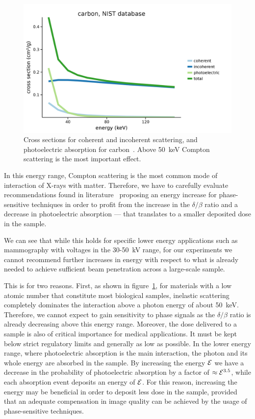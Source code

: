 \begin{figure}[htb]
    \centering
    \includegraphics[width=\textwidth]{gfx/compton/carbon_cross_section.png}
    \caption[Scattering cross sections.]{Cross sections for coherent and incoherent scattering, and
        photoelectric absorption for carbon~\parencite{nist}. Above \SI{50}{\kilo\eV} Compton
    scattering is the most important effect.}
    \label{fig:carbon-cross-sections}
\end{figure}

In this energy range, Compton scattering is the most common mode of
interaction of X-rays with matter. Therefore, we have to carefully evaluate recommendations found in
literature~\parencite{Wong2014} proposing an energy increase for
phase-sensitive techniques in order to profit from the increase in the
$\delta/\beta$ ratio and a decrease in photoelectric absorption --- that
translates to a smaller deposited dose in the sample.

We can see that while this holds for specific lower energy applications such
as mammography with voltages in the \num{30}-\SI{50}{\kilo\volt} range, for
our experiments we cannot recommend further increases in energy with respect
to what is already needed to achieve sufficient beam penetration across a
large-scale sample.

This is for two reasons. First, as shown in
figure~\ref{fig:carbon-cross-sections}, for materials with a low atomic
number that constitute most biological samples, inelastic scattering
completely dominates the interaction above a photon energy of about \SI{50}{\kilo\eV}.
Therefore, we cannot expect to gain sensitivity to phase signals as the
$\delta/\beta$ ratio is already decreasing above this energy range.
Moreover, the dose delivered to a sample is also of critical importance for
medical applications. It must be kept below strict regulatory limits and
generally as low as possible.
In the lower energy range, where photoelectric absorption is the main
interaction, the photon and its whole energy are absorbed in the sample.
By increasing the energy $\mathcal{E}$ we have a decrease in the probability of
photoelectric absorption by a
factor of $\approx\mathcal{E}^{3.5}$, while each absorption event deposits an
energy of $\mathcal{E}$. For this reason, increasing the energy may be
beneficial in order to deposit less dose in the sample, provided that an
adequate compensation in image quality can be achieved by the usage of
phase-sensitive techniques.

